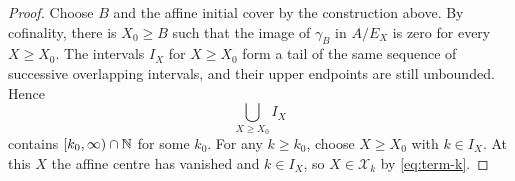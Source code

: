\begin{proof}
Choose $B$ and the affine initial cover by the construction above.  By cofinality, there is $X_0\ge B$ such that the image of $\gamma_B$ in $A/E_X$ is zero for every $X\ge X_0$.  The intervals $I_X$ for $X\ge X_0$ form a tail of the same sequence of successive overlapping intervals, and their upper endpoints are still unbounded.  Hence
\[
\bigcup_{X\ge X_0} I_X
\]
contains $[k_0,\infty)\cap\mathbb N$ for some $k_0$.  For any $k\ge k_0$, choose $X\ge X_0$ with $k\in I_X$.  At this $X$ the affine centre has vanished and $k\in I_X$, so $X\in\mathcal X_k$ by \eqref{eq:term-k}.
\end{proof}
